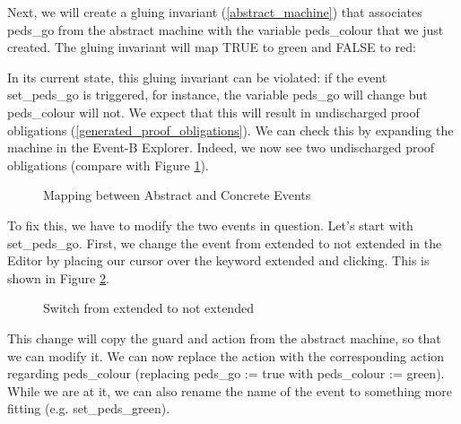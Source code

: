 Next, we will create a gluing invariant (\ref{abstract_machine}) that associates \textsf{peds\_go} from the abstract machine with the variable \textsf{peds\_colour} that we just created.  The gluing invariant will map \textsf{TRUE} to \textsf{green} and \textsf{FALSE} to \textsf{red}:


In its current state, this gluing invariant can be violated: if the event \textsf{set\_peds\_go} is triggered, for instance, the variable \textsf{peds\_go} will change but \textsf{peds\_colour} will not.  We expect that this will result in undischarged proof obligations (\ref{generated_proof_obligations}).  We can check this by expanding the machine in the Event-B Explorer.  Indeed, we now see two undischarged proof obligations (compare with Figure \ref{fig_tut_07_undischarged}).

\begin{figure}[!ht]
\begin{center}
	\caption{Mapping between Abstract and Concrete Events}
	\label{fig_tut_07_undischarged}
\end{center}
\end{figure}

To fix this, we have to modify the two events in question.  Let's start with \textsf{set\_peds\_go}.  First, we change the event from extended to not extended in the Editor by placing our cursor over the keyword \textsf{extended} and clicking. This is shown in Figure \ref{fig_tut_07_event_refinement}.

\begin{figure}[!ht]
\begin{center}
	\caption{Switch from extended to not extended}
	\label{fig_tut_07_event_refinement}
\end{center}
\end{figure}

This change will copy the guard and action from the abstract machine, so that we can modify it.  We can now replace the action with the corresponding action regarding \textsf{peds\_colour} (replacing \textsf{peds\_go := true} with \textsf{peds\_colour := green}).  While we are at it, we can also rename the name of the event to something more fitting (e.g. \textsf{set\_peds\_green}).

